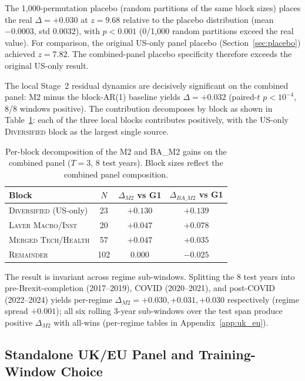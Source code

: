 \documentclass[11pt,a4paper]{article}
\begin{document}
The 1{,}000-permutation placebo (random partitions of the same block sizes) places the real $\Delta = +0.030$ at $z = 9.68$ relative to the placebo distribution (mean $-0.0003$, std $0.0032$), with $p < 0.001$ (0/1{,}000 random partitions exceed the real value). For comparison, the original US-only panel placebo (Section~\ref{sec:placebo}) achieved $z = 7.82$. The combined-panel placebo specificity therefore exceeds the original US-only result.

The local Stage~2 residual dynamics are decisively significant on the combined panel: M2 minus the block-AR(1) baseline yields $\Delta = +0.032$ (paired-$t$ $p < 10^{-4}$, 8/8 windows positive). The contribution decomposes by block as shown in Table~\ref{tab:combined_per_block}: each of the three local blocks contributes positively, with the US-only \textsc{Diversified} block as the largest single source.

\begin{table}[H]
\centering
\caption{Per-block decomposition of the M2 and BA\_M2 gains on the combined panel ($T=3$, 8 test years). Block sizes reflect the combined panel composition.}
\label{tab:combined_per_block}
\small
\begin{tabular}{lccc}
\toprule
Block & $N$ & $\Delta_{M2}$ vs G1 & $\Delta_{BA\_M2}$ vs G1 \\
\midrule
\textsc{Diversified} (US-only) & 23 & $+0.130$ & $+0.139$ \\
\textsc{Layer Macro/Inst} & 20 & $+0.047$ & $+0.078$ \\
\textsc{Merged Tech/Health} & 57 & $+0.047$ & $+0.035$ \\
\textsc{Remainder} & 102 & $0.000$ & $-0.025$ \\
\bottomrule
\end{tabular}
\end{table}

The result is invariant across regime sub-windows. Splitting the 8 test years into pre-Brexit-completion (2017--2019), COVID (2020--2021), and post-COVID (2022--2024) yields per-regime $\Delta_{M2} = +0.030, +0.031, +0.030$ respectively (regime spread $+0.001$); all six rolling 3-year sub-windows over the test span produce positive $\Delta_{M2}$ with all-wins (per-regime tables in Appendix~\ref{app:uk_eu}).

\subsection{Standalone UK/EU Panel and Training-Window Choice}
\end{document}
